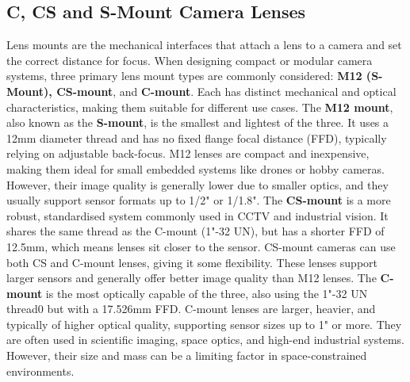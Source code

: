\documentclass[10pt]{article}
\begin{document}
\begin{multicols}{2}
\subsection{C, CS and S-Mount Camera Lenses}
Lens mounts are the mechanical interfaces that attach a lens to a camera and set the correct distance for focus. When designing compact or modular camera systems, three primary lens mount types are commonly considered: \textbf{M12 (S-Mount), CS-mount}, and \textbf{C-mount}. Each has distinct mechanical and optical characteristics, making them suitable for different use cases.
\newline \newline
The \textbf{M12 mount}, also known as the \textbf{S-mount}, is the smallest and lightest of the three. It uses a 12mm diameter thread and has no fixed flange focal distance (FFD), typically relying on adjustable back-focus. M12 lenses are compact and inexpensive, making them ideal for small embedded systems like drones or hobby cameras. However, their image quality is generally lower due to smaller optics, and they usually support sensor formats up to 1/2" or 1/1.8".
\newline \newline
The \textbf{CS-mount} is a more robust, standardised system commonly used in CCTV and industrial vision. It shares the same thread as the C-mount (1"-32 UN), but has a shorter FFD of 12.5mm, which means lenses sit closer to the sensor. CS-mount cameras can use both CS and C-mount lenses, giving it some flexibility. These lenses support larger sensors and generally offer better image quality than M12 lenses.
\newline \newline
The \textbf{C-mount} is the most optically capable of the three, also using the 1"-32 UN thread0 but with a 17.526mm FFD. C-mount lenses are larger, heavier, and typically of higher optical quality, supporting sensor sizes up to 1" or more. They are often used in scientific imaging, space optics, and high-end industrial systems. However, their size and mass can be a limiting factor in space-constrained environments.


\end{multicols}
\end{document}

